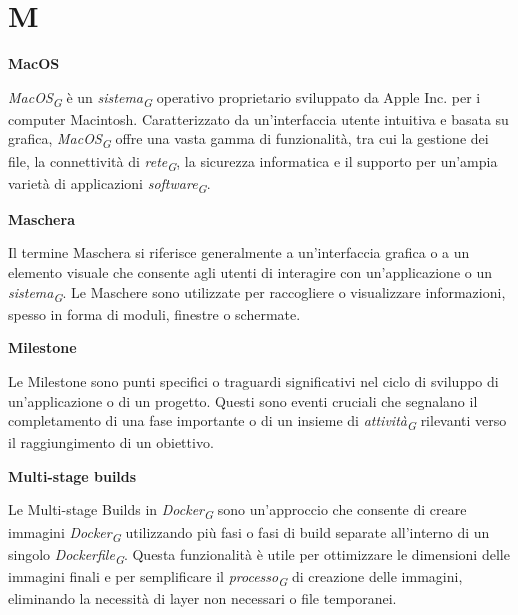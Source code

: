 \documentclass{article}
\begin{document}
\pagebreak
\section*{M}
{}

\vspace{0.4cm}

\textbf{MacOS}

\vspace{0.1cm}

\textit{MacOS}\textsubscript{\textit{G}} è un \textit{sistema}\textsubscript{\textit{G}} operativo proprietario sviluppato da Apple Inc. per i computer Macintosh. Caratterizzato da un'interfaccia utente intuitiva e basata su grafica, \textit{MacOS}\textsubscript{\textit{G}} offre una vasta gamma di funzionalità, tra cui la gestione dei file, la connettività di \textit{rete}\textsubscript{\textit{G}}, la sicurezza informatica e il supporto per un'ampia varietà di applicazioni \textit{software}\textsubscript{\textit{G}}.


\vspace{0.4cm}

\textbf{Maschera}

\vspace{0.1cm}

Il termine Maschera si riferisce generalmente a un'interfaccia grafica o a un elemento visuale che consente agli utenti di interagire con un'applicazione o un \textit{sistema}\textsubscript{\textit{G}}. Le Maschere sono utilizzate per raccogliere o visualizzare informazioni, spesso in forma di moduli, finestre o schermate.

\vspace{0.4cm}

\textbf{Milestone}

\vspace{0.1cm}

Le Milestone sono punti specifici o traguardi significativi nel ciclo di sviluppo di un'applicazione o di un progetto. Questi sono eventi cruciali che segnalano il completamento di una fase importante o di un insieme di \textit{attività}\textsubscript{\textit{G}} rilevanti verso il raggiungimento di un obiettivo.

\vspace{0.4cm}

\textbf{Multi-stage builds}

\vspace{0.1cm}

Le Multi-stage Builds in \textit{Docker}\textsubscript{\textit{G}} sono un'approccio che consente di creare immagini \textit{Docker}\textsubscript{\textit{G}} utilizzando più fasi o fasi di build separate all'interno di un singolo \textit{Dockerfile}\textsubscript{\textit{G}}. Questa funzionalità è utile per ottimizzare le dimensioni delle immagini finali e per semplificare il \textit{processo}\textsubscript{\textit{G}} di creazione delle immagini, eliminando la necessità di layer non necessari o file temporanei.
\end{document}
